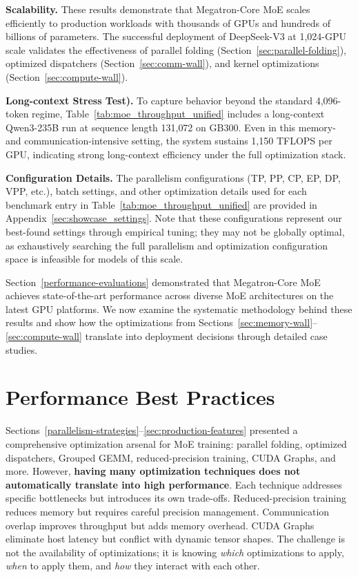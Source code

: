 \documentclass[10pt,logo,copyright]{nvidiatechreport}
\begin{document}
\textbf{Scalability.}
These results demonstrate that Megatron-Core MoE scales efficiently to production workloads with thousands of GPUs and hundreds of billions of parameters. The successful deployment of DeepSeek-V3 at 1,024-GPU scale validates the effectiveness of parallel folding (Section~\ref{sec:parallel-folding}), optimized dispatchers (Section~\ref{sec:comm-wall}), and kernel optimizations (Section~\ref{sec:compute-wall}).

\textbf{Long-context Stress Test).}
To capture behavior beyond the standard 4{,}096-token regime, Table~\ref{tab:moe_throughput_unified} includes a long-context Qwen3-235B run at sequence length 131{,}072 on GB300. Even in this memory- and communication-intensive setting, the system sustains 1{,}150 TFLOPS per GPU, indicating strong long-context efficiency under the full optimization stack.

\noindent
\textbf{Configuration Details.} The parallelism configurations (TP, PP, CP, EP, DP, VPP, etc.), batch settings, and other optimization details used for each benchmark entry in Table~\ref{tab:moe_throughput_unified} are provided in Appendix~\ref{sec:showcase_settings}. Note that these configurations represent our best-found settings through empirical tuning; they may not be globally optimal, as exhaustively searching the full parallelism and optimization configuration space is infeasible for models of this scale.

Section~\ref{performance-evaluations} demonstrated that Megatron-Core MoE achieves state-of-the-art performance across diverse MoE architectures on the latest GPU platforms. We now examine the systematic methodology behind these results and show how the optimizations from Sections~\ref{sec:memory-wall}--\ref{sec:compute-wall} translate into deployment decisions through detailed case studies.

\section{Performance Best Practices}\label{sec:best-practices}

Sections~\ref{parallelism-strategies}--\ref{sec:production-features} presented a comprehensive optimization arsenal for MoE training: parallel folding, optimized dispatchers, Grouped GEMM, reduced-precision training, CUDA Graphs, and more. However, \textbf{having many optimization techniques does not automatically translate into high performance}. Each technique addresses specific bottlenecks but introduces its own trade-offs. Reduced-precision training reduces memory but requires careful precision management. Communication overlap improves throughput but adds memory overhead. CUDA Graphs eliminate host latency but conflict with dynamic tensor shapes. The challenge is not the availability of optimizations; it is knowing \emph{which} optimizations to apply, \emph{when} to apply them, and \emph{how} they interact with each other.
\end{document}
